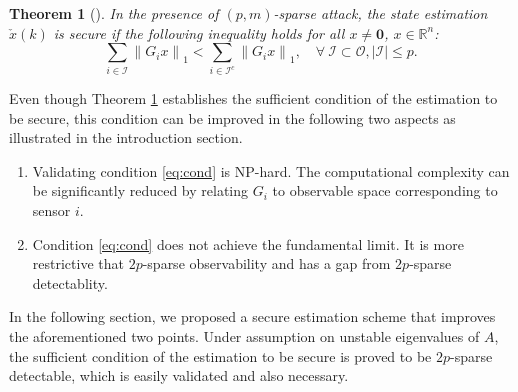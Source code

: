\documentclass[12pt]{article}  %
\newcommand{\Rb}{{\mathbb{R}}}
\newcommand{\Ic}{{\mathcal{I}}}
\newcommand{\Oc}{{\mathcal{O}}}
\newtheorem{theorem}{\textbf{Theorem}}
\begin{document}
\begin{theorem}[\hspace{-0.01pt}\cite{liuxinghua-TAC2020}]\label{th:TAC}
	In the presence of $(p, m)$-sparse attack, the state estimation $\check{x}(k)$ is secure if the following inequality holds for all $x \neq \mathbf{0}$, $x\in\Rb^n$:
\begin{equation}\label{eq:cond}
	\sum_{i \in \mathcal{I}}\left\|G_{i} x\right\|_{1}<\sum_{i \in \mathcal{I}^{c}}\left\|G_{i} x\right\|_{1}, \quad \forall\ \Ic\subset \Oc, |\mathcal{I}|\leq p .
\end{equation}
\end{theorem}
Even though Theorem \ref{th:TAC} establishes the sufficient condition of the estimation to be secure, this condition can be improved in the following two aspects as illustrated in the introduction section.
\begin{enumerate}[left=0pt]
	\item Validating condition \eqref{eq:cond} is NP-hard. The computational complexity can be significantly reduced by relating $G_i$ to observable space corresponding to sensor $i$.
	\item Condition \eqref{eq:cond} does not achieve the fundamental limit. It is more restrictive that $2p$-sparse observability and has a gap from $2p$-sparse detectablity.
\end{enumerate}

In the following section, we proposed a secure estimation scheme that improves the aforementioned two points.
Under assumption on unstable eigenvalues of $A$, the sufficient condition of the estimation to be secure is proved to be $2p$-sparse detectable, which is easily validated and also necessary.

\end{document}
